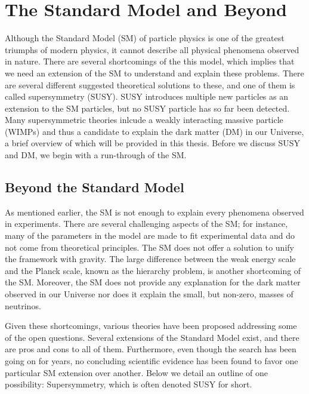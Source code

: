 \chapter{The Standard Model and Beyond}
\label{sec:Theory}
Although the Standard Model (SM) of particle physics is one of the greatest triumphs of modern physics, it cannot describe all physical phenomena observed in nature. There are several shortcomings of the this model, which implies that we need an extension of the SM to understand and explain these problems. There are several different suggested theoretical solutions to these, and one of them is called supersymmetry (SUSY). SUSY introduces multiple new particles as an extension to the SM particles, but no SUSY particle has so far been detected. Many supersymmetric theories inlcude a weakly interacting massive particle (WIMPs) and thus a candidate to explain the dark matter (DM) in our Universe, a brief overview of which will be provided in this thesis. Before we discuss SUSY and DM, we begin with a run-through of the SM.



\section{Beyond the Standard Model}
As mentioned earlier, the SM is not enough to explain every phenomena observed in experiments. There are several challenging aspects of the SM; for instance, many of the parameters in the model are made to fit experimental data and do not come from theoretical principles. 
The SM does not offer a solution to unify the framework with gravity. The large difference between the weak energy scale and the Planck scale, known as the hierarchy problem, is another shortcoming of the SM. Moreover, the SM does not provide any explanation for the dark matter observed in our Universe nor does it explain the small, but non-zero, masses of neutrinos.  

Given these shortcomings, various theories have been proposed addressing some of the open questions. Several extensions of the Standard Model exist, and there are pros and cons to all of them. Furthermore, even though the search has been going on for years, no concluding scientific evidence has been found to favor one particular SM extension over another. Below we detail an outline of one possibility:
Supersymmetry, which is often denoted SUSY for short.



